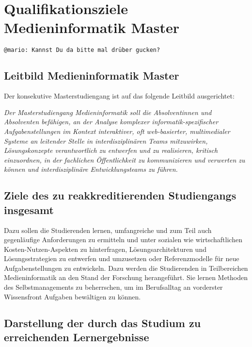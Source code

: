 \chapter{Qualifikationsziele Medieninformatik
Master}\label{qualifikationsziele-medieninformatik-master}

\begin{verbatim}
@mario: Kannst Du da bitte mal drüber gucken?
\end{verbatim}

\section{Leitbild Medieninformatik
Master}\label{leitbild-medieninformatik-master}

Der konsekutive Masterstudiengang ist auf das folgende Leitbild
ausgerichtet:

\emph{Der Masterstudiengang Medieninformatik soll die Absolventinnen und
Absolventen befähigen, an der Analyse komplexer informatik-spezifischer
Aufgabenstellungen im Kontext interaktiver, oft web-basierter,
multimedialer Systeme an leitender Stelle in interdisziplinären Teams
mitzuwirken, Lösungskonzepte verantwortlich zu entwerfen und zu
realisieren, kritisch einzuordnen, in der fachlichen Öffentlichkeit zu
kommunizieren und verwerten zu können und interdisziplinäre
Entwicklungsteams zu führen.}

\section{Ziele des zu reakkreditierenden Studiengangs
insgesamt}\label{ziele-des-zu-reakkreditierenden-studiengangs-insgesamt}

Dazu sollen die Studierenden lernen, umfangreiche und zum Teil auch
gegenläufige Anforderungen zu ermitteln und unter sozialen wie
wirtschaftlichen Kosten-Nutzen-Aspekten zu hinterfragen,
Lösungsarchitekturen und Lösungsstrategien zu entwerfen und umzusetzen
oder Referenzmodelle für neue Aufgabenstellungen zu entwickeln. Dazu
werden die Studierenden in Teilbereichen Medieninformatik an den Stand
der Forschung herangeführt. Sie lernen Methoden des Selbstmanagements zu
beherrschen, um im Berufsalltag an vorderster Wissensfront Aufgaben
bewältigen zu können.

\section{Darstellung der durch das Studium zu erreichenden
Lernergebnisse}\label{darstellung-der-durch-das-studium-zu-erreichenden-lernergebnisse}

